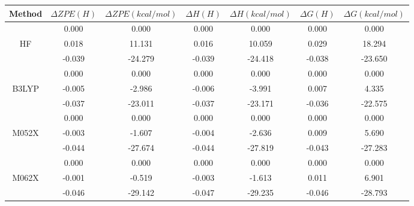 
\begin{tabular}{|c|c|c|c|c|c|c|}
    \hline
    \textbf{Method} & \textbf{$\Delta ZPE (H)$} & \textbf{$\Delta ZPE (kcal/mol)$ } & \textbf{$\Delta H (H)$} & \textbf{$\Delta H (kcal/mol)$} & \textbf{$\Delta G (H)$} & \textbf{$\Delta G (kcal/mol)$} \\ \hline
                    & 0.000             & 0.000                    & 0.000           & 0.000                  & 0.000           & 0.000                  \\ \hline
    HF              & 0.018             & 11.131                   & 0.016           & 10.059                 & 0.029           & 18.294                 \\ \hline
                    & -0.039            & -24.279                  & -0.039          & -24.418                & -0.038          & -23.650                \\ \hline
                    & 0.000             & 0.000                    & 0.000           & 0.000                  & 0.000           & 0.000                  \\ \hline
    B3LYP           & -0.005            & -2.986                   & -0.006          & -3.991                 & 0.007           & 4.335                  \\ \hline
                    & -0.037            & -23.011                  & -0.037          & -23.171                & -0.036          & -22.575                \\ \hline
                    & 0.000             & 0.000                    & 0.000           & 0.000                  & 0.000           & 0.000                  \\ \hline
    M052X           & -0.003            & -1.607                   & -0.004          & -2.636                 & 0.009           & 5.690                  \\ \hline
                    & -0.044            & -27.674                  & -0.044          & -27.819                & -0.043          & -27.283                \\ \hline
                    & 0.000             & 0.000                    & 0.000           & 0.000                  & 0.000           & 0.000                  \\ \hline
    M062X           & -0.001            & -0.519                   & -0.003          & -1.613                 & 0.011           & 6.901                  \\ \hline
                    & -0.046            & -29.142                  & -0.047          & -29.235                & -0.046          & -28.793                \\ \hline
\end{tabular}
